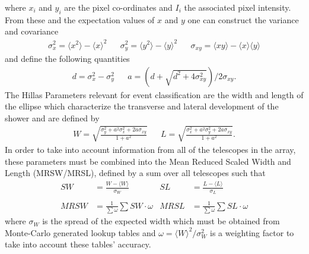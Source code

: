 where $x_i$ and $y_i$ are the pixel co-ordinates and $I_i$ the associated pixel intensity. From these and the expectation values of $x$ and $y$ one can construct the variance and covariance
\begin{align*}
\sigma_x^2=\langle x^2 \rangle - \langle x \rangle^2&&\sigma_y^2=\langle y^2 \rangle - \langle y \rangle^2&&\sigma_{xy}=\langle xy \rangle - \langle x \rangle\langle y \rangle
\end{align*}
and define the following quantities
\begin{align*}
d=\sigma_x^2-\sigma_y^2&&a=(d+\sqrt{d^2+4\sigma_{xy}^2})/2\sigma_{xy}.
\end{align*}
The Hillas Parameters relevant for event classification are the width and length of the ellipse which characterize the transverse and lateral development of the shower and are defined by
\begin{align*}
W=\sqrt{\frac{\sigma_y^2+a^2\sigma_x^2+2a\sigma_{xy}}{1+a^2}}&&L=\sqrt{\frac{\sigma_x^2+a^2\sigma_y^2+2a\sigma_{xy}}{1+a^2}}.
\end{align*}
In order to take into account information from all of the telescopes in the array, these parameters must be combined into the Mean Reduced Scaled Width and Length (MRSW/MRSL), defined by a sum over all telescopes such that
\begin{align*}
SW&=\frac{W-\langle W \rangle}{\sigma_W}   &    SL&=\frac{L-\langle L \rangle}{\sigma_L}\\
\\ MRSW&=\frac{1}{\sum \omega}\sum SW\cdot \omega & MRSL&=\frac{1}{\sum \omega}\sum SL\cdot \omega
\end{align*}
where $\sigma_W$ is the spread of the expected width which must be obtained from Monte-Carlo generated lookup tables and $\omega=\langle W \rangle^2/\sigma_W^2$ is a weighting factor to take into account these tables' accuracy.

